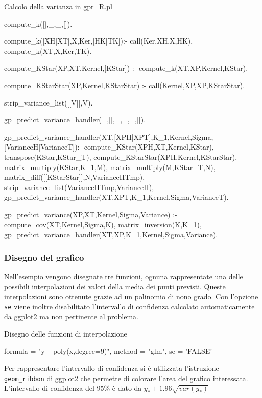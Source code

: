 \documentclass[10pt,titlepage,twoside,a4paper]{report}
\newenvironment{code}{\singlespacing\captionsetup{type=listing}}{}
\begin{document}
\begin{code}
\caption{Calcolo della varianza in gpr\_R.pl}
\label{lst:gprRVarianceComputation}
\begin{prologcode*}{}
compute_k([],_,_,[]).

compute_k([XH|XT],X,Ker,[HK|TK]):-
  call(Ker,XH,X,HK),
  compute_k(XT,X,Ker,TK).

compute_KStar(XP,XT,Kernel,[KStar]) :-
    compute_k(XT,XP,Kernel,KStar).

compute_KStarStar(XP,Kernel,KStarStar) :-
    call(Kernel,XP,XP,KStarStar).

strip_variance_list([[V]],V).

gp_predict_variance_handler(_,[],_,_,_,[]).

gp_predict_variance_handler(XT,[XPH|XPT],K_1,Kernel,Sigma,[VarianceH|VarianceT]):-
    compute_KStar(XPH,XT,Kernel,KStar),
    transpose(KStar,KStar_T),
    compute_KStarStar(XPH,Kernel,KStarStar),
    matrix_multiply(KStar,K_1,M),
    matrix_multiply(M,KStar_T,N),
    matrix_diff([[KStarStar]],N,VarianceHTmp),
    strip_variance_list(VarianceHTmp,VarianceH),
    gp_predict_variance_handler(XT,XPT,K_1,Kernel,Sigma,VarianceT).

gp_predict_variance(XP,XT,Kernel,Sigma,Variance) :-
    compute_cov(XT,Kernel,Sigma,K),
    matrix_inversion(K,K_1),
    gp_predict_variance_handler(XT,XP,K_1,Kernel,Sigma,Variance).
\end{prologcode*}
\end{code}

\subsubsection{Disegno del grafico}

Nell'esempio vengono disegnate tre funzioni, ognuna rappresentate una 
delle possibili interpolazioni dei valori della media dei punti previsti.
Queste interpolazioni sono ottenute grazie ad un polinomio di nono grado.
Con l'opzione \texttt{se} viene inoltre disabilitato l'intervallo di 
confidenza calcolato automaticamente da ggplot2 ma non pertinente al problema.

\begin{code}
\caption{Disegno delle funzioni di interpolazione}
\begin{rcode*}{}
formula = "y ~ poly(x,degree=9)",
method = "glm",
se = 'FALSE'
\end{rcode*}
\end{code}

Per rappresentare l'intervallo di confidenza si è utilizzata l'istruzione
\texttt{geom\_ribbon} di ggplot2 che permette di colorare l'area del grafico 
interessata. L'intervallo di confidenza del 95\% è dato da $\bar{y}_{\ast} \pm 
1.96\sqrt{var(y_{\ast})}$ 
\end{document}
